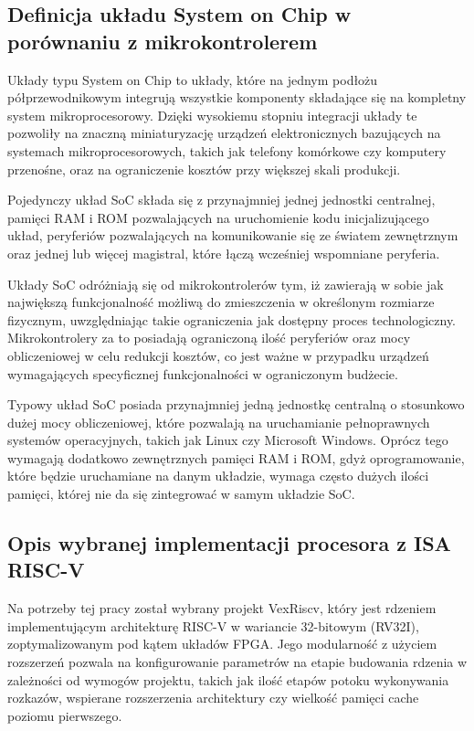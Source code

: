 
\subsection{Definicja układu System on Chip w porównaniu z mikrokontrolerem}

Układy typu System on Chip to układy, które na jednym podłożu półprzewodnikowym integrują wszystkie komponenty składające się na kompletny system mikroprocesorowy. Dzięki wysokiemu stopniu integracji układy te pozwoliły na znaczną miniaturyzację urządzeń elektronicznych bazujących na systemach mikroprocesorowych, takich jak telefony komórkowe czy komputery przenośne, oraz na ograniczenie kosztów przy większej skali produkcji.

Pojedynczy układ SoC składa się z przynajmniej jednej jednostki centralnej, pamięci RAM i ROM pozwalających na uruchomienie kodu inicjalizującego układ, peryferiów pozwalających na komunikowanie się ze światem zewnętrznym oraz jednej lub więcej magistral, które łączą wcześniej wspomniane peryferia.

Układy SoC odróżniają się od mikrokontrolerów tym, iż zawierają w sobie jak największą funkcjonalność możliwą do zmieszczenia w określonym rozmiarze fizycznym, uwzględniając takie ograniczenia jak dostępny proces technologiczny. Mikrokontrolery za to posiadają ograniczoną ilość peryferiów oraz mocy obliczeniowej w celu redukcji kosztów, co jest ważne w przypadku urządzeń wymagających specyficznej funkcjonalności w ograniczonym budżecie.

Typowy układ SoC posiada przynajmniej jedną jednostkę centralną o stosunkowo dużej mocy obliczeniowej, które pozwalają na uruchamianie pełnoprawnych systemów operacyjnych, takich jak Linux czy Microsoft Windows. Oprócz tego wymagają dodatkowo zewnętrznych pamięci RAM i ROM, gdyż oprogramowanie, które będzie uruchamiane na danym układzie, wymaga często dużych ilości pamięci, której nie da się zintegrować w samym układzie SoC.


\subsection{Opis wybranej implementacji procesora z ISA RISC-V}

Na potrzeby tej pracy został wybrany projekt VexRiscv\cite{vexriscv:2018:Online}, który jest rdzeniem implementującym architekturę RISC-V w wariancie 32-bitowym (RV32I), zoptymalizowanym pod kątem układów FPGA. Jego modularność z użyciem rozszerzeń pozwala na konfigurowanie parametrów na etapie budowania rdzenia w zależności od wymogów projektu, takich jak ilość etapów potoku wykonywania rozkazów, wspierane rozszerzenia architektury czy wielkość pamięci cache poziomu pierwszego.

